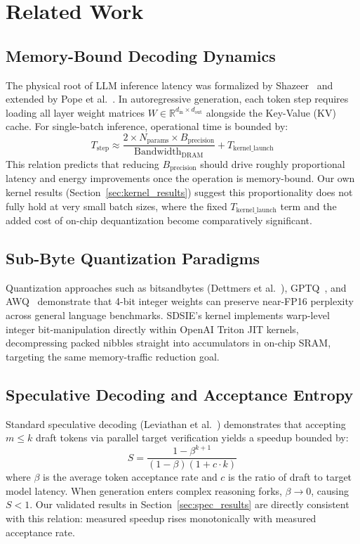 \documentclass[10pt,journal,compsoc,twocolumn]{IEEEtran}
\begin{document}
\section{Related Work}

\subsection{Memory-Bound Decoding Dynamics}
The physical root of LLM inference latency was formalized by Shazeer~\cite{shazeer2019fast} and extended by Pope et al.~\cite{pope2023efficiently}. In autoregressive generation, each token step requires loading all layer weight matrices $W \in \mathbb{R}^{d_{\text{in}} \times d_{\text{out}}}$ alongside the Key-Value (KV) cache. For single-batch inference, operational time is bounded by:
\begin{equation}
T_{\text{step}} \approx \frac{2 \times N_{\text{params}} \times B_{\text{precision}}}{\text{Bandwidth}_{\text{DRAM}}} + T_{\text{kernel\_launch}}
\end{equation}
This relation predicts that reducing $B_{\text{precision}}$ should drive roughly proportional latency and energy improvements once the operation is memory-bound. Our own kernel results (Section~\ref{sec:kernel_results}) suggest this proportionality does not fully hold at very small batch sizes, where the fixed $T_{\text{kernel\_launch}}$ term and the added cost of on-chip dequantization become comparatively significant.

\subsection{Sub-Byte Quantization Paradigms}
Quantization approaches such as bitsandbytes (Dettmers et al.~\cite{dettmers2022llm}), GPTQ~\cite{frantar2022gptq}, and AWQ~\cite{lin2023awq} demonstrate that 4-bit integer weights can preserve near-FP16 perplexity across general language benchmarks. SDSIE's kernel implements warp-level integer bit-manipulation directly within OpenAI Triton JIT kernels, decompressing packed nibbles straight into accumulators in on-chip SRAM, targeting the same memory-traffic reduction goal.

\subsection{Speculative Decoding and Acceptance Entropy}
Standard speculative decoding (Leviathan et al.~\cite{leviathan2023fast}) demonstrates that accepting $m \le k$ draft tokens via parallel target verification yields a speedup bounded by:
\begin{equation}
S = \frac{1 - \beta^{k+1}}{(1 - \beta)(1 + c \cdot k)}
\end{equation}
where $\beta$ is the average token acceptance rate and $c$ is the ratio of draft to target model latency. When generation enters complex reasoning forks, $\beta \to 0$, causing $S < 1$. Our validated results in Section~\ref{sec:spec_results} are directly consistent with this relation: measured speedup rises monotonically with measured acceptance rate.
\end{document}
